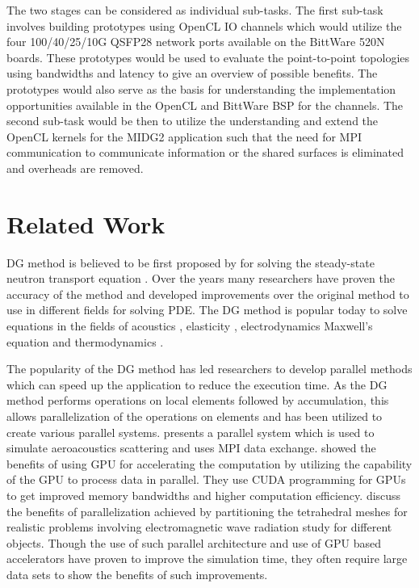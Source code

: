 The two stages can be considered as individual sub-tasks. The first sub-task involves building
prototypes using OpenCL IO channels which would utilize the four 100/40/25/10G QSFP28
network ports available on the BittWare 520N boards. These prototypes would be used
to evaluate the point-to-point topologies using bandwidths and latency to give an
overview of possible benefits. The prototypes would also serve as the basis for
understanding the implementation opportunities available in the OpenCL and
BittWare BSP for the channels. The second sub-task would be then to utilize the
understanding and extend the OpenCL kernels for the MIDG2 application
such that the need for \ac{MPI} communication to communicate information or the shared
surfaces is eliminated and overheads are removed.

\section{Related Work}

\ac{DG} method is believed to be first proposed by \textcite{reed_triangular_1973} for
solving the steady-state neutron transport equation \cite{hesthaven_nodal_2008}. Over the
years many researchers have proven the accuracy of the method and developed improvements
over the original method to use in different fields for solving \ac{PDE}. The \ac{DG} method
is popular today to solve equations in the fields of acoustics \cite{wilcox_high-order_2010,
atkins_quadrature-free_1998, toulopoulos_high-order_2006}, elasticity \cite{dumbser_arbitrary_2006,
kaser_arbitrary_2006, kaser_arbitrary_2007}, electrodynamics Maxwell’s equation \cite{busch_discontinuous_2011,
cohen_discontinuous_2006, busch_discontinuous_2011, cohen_spatial_2006, cockburn_locally_2004,
konig_discontinuous_2010} and thermodynamics \cite{collis_discontinuous_2002}.

The popularity of the \ac{DG} method has led researchers to develop parallel methods
which can speed up the application to reduce the execution time. As the DG method
performs operations on local elements followed by accumulation, this allows parallelization
of the operations on elements and has been utilized to create various parallel systems.
\textcite{baggag_parallel_1999} presents a parallel system which is used to simulate aeroacoustics
scattering and uses \ac{MPI} data exchange. \textcite{klockner_nodal_2009} showed the benefits
of using GPU for accelerating the computation by utilizing the capability of the GPU to
process data in parallel. They use CUDA programming for GPUs to get improved memory bandwidths
and higher computation efficiency. \textcite{bernacki_parallel_2006} discuss the benefits
of parallelization achieved by partitioning the tetrahedral meshes for realistic problems
involving electromagnetic wave radiation study for different objects. Though the use of such
parallel architecture and use of GPU based accelerators have proven
to improve the simulation time, they often require large data sets to show the benefits of
such improvements.


